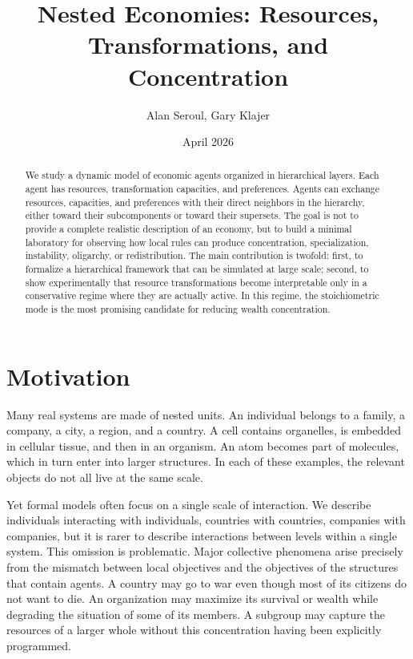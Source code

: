 \documentclass[11pt]{article}
\title{Nested Economies: Resources, Transformations, and Concentration}
\author{Alan Seroul, Gary Klajer}
\date{April 2026}
\begin{document}
\maketitle

\begin{abstract}
We study a dynamic model of economic agents organized in hierarchical layers. Each agent has resources, transformation capacities, and preferences. Agents can exchange resources, capacities, and preferences with their direct neighbors in the hierarchy, either toward their subcomponents or toward their supersets. The goal is not to provide a complete realistic description of an economy, but to build a minimal laboratory for observing how local rules can produce concentration, specialization, instability, oligarchy, or redistribution. The main contribution is twofold: first, to formalize a hierarchical framework that can be simulated at large scale; second, to show experimentally that resource transformations become interpretable only in a conservative regime where they are actually active. In this regime, the stoichiometric mode is the most promising candidate for reducing wealth concentration.
\end{abstract}

\section{Motivation}

Many real systems are made of nested units. An individual belongs to a family, a company, a city, a region, and a country. A cell contains organelles, is embedded in cellular tissue, and then in an organism. An atom becomes part of molecules, which in turn enter into larger structures. In each of these examples, the relevant objects do not all live at the same scale.

Yet formal models often focus on a single scale of interaction. We describe individuals interacting with individuals, countries with countries, companies with companies, but it is rarer to describe interactions between levels within a single system. This omission is problematic. Major collective phenomena arise precisely from the mismatch between local objectives and the objectives of the structures that contain agents. A country may go to war even though most of its citizens do not want to die. An organization may maximize its survival or wealth while degrading the situation of some of its members. A subgroup may capture the resources of a larger whole without this concentration having been explicitly programmed.
\end{document}

